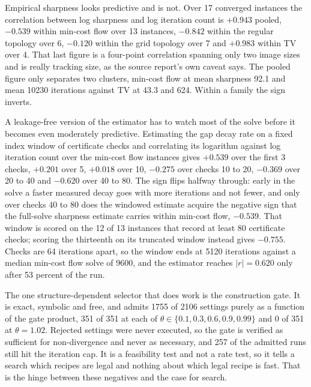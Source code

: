 Empirical sharpness looks predictive and is not. Over 17 converged instances the
correlation between log sharpness and log iteration count is $+0.943$ pooled,
$-0.539$ within min-cost flow over 13 instances, $-0.842$ within the regular
topology over 6, $-0.120$ within the grid topology over 7 and $+0.983$ within
TV over 4. That last figure is a four-point correlation spanning only two image
sizes and is really tracking size, as the source report's own caveat says. The
pooled figure only separates two clusters, min-cost flow at mean sharpness 92.1
and mean 10230 iterations against TV at 43.3 and 624. Within a family the sign
inverts.

A leakage-free version of the estimator has to watch most of the solve before it
becomes even moderately predictive. Estimating the gap decay rate on a fixed
index window of certificate checks and correlating its logarithm against log
iteration count over the min-cost flow instances gives $+0.539$ over the first 3
checks, $+0.201$ over 5, $+0.018$ over 10, $-0.275$ over checks 10 to 20,
$-0.369$ over 20 to 40 and $-0.620$ over 40 to 80. The sign flips halfway
through: early in the solve a faster measured decay goes with more iterations
and not fewer, and only over checks 40 to 80 does the windowed estimate acquire
the negative sign that the full-solve sharpness estimate carries within
min-cost flow, $-0.539$. That window is scored on the 12 of 13 instances
that record at least 80 certificate checks; scoring the thirteenth on its
truncated window instead gives $-0.755$. Checks are 64 iterations apart, so the
window ends at 5120 iterations against a median min-cost flow solve of 9600, and
the estimator reaches $|r| = 0.620$ only after 53 percent of the run.

The one structure-dependent selector that does work is the construction gate.
It is exact, symbolic and free, and admits 1755 of 2106 settings purely as a
function of the gate product, 351 of 351 at each of $\theta \in \{0.1, 0.3,
0.6, 0.9, 0.99\}$ and 0 of 351 at $\theta = 1.02$. Rejected settings were never
executed, so the gate is verified as sufficient for non-divergence and never as
necessary, and 257 of the admitted runs still hit the iteration cap. It is a
feasibility test and not a rate test, so it tells a search which recipes are
legal and nothing about which legal recipe is fast. That is the hinge between
these negatives and the case for search.

